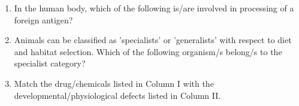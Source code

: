 \documentclass[journal,12pt,onecolumn]{IEEEtran}
\theoremstyle{remark}
\begin{document}
\begin{enumerate}
    \item In the human body, which of the following is/are involved in processing of a foreign antigen?

    \hfill{}
    \begin{enumerate}
    \end{enumerate}

    \item Animals can be classified as 'specialists' or 'generalists' with respect to diet and habitat selection. Which of the following organism/s belong/s to the specialist category?

    \hfill{}
    \begin{enumerate}
    \end{enumerate}

    \item Match the drug/chemicals listed in Column I with the developmental/physiological defects listed in Column II.


\end{enumerate}
\end{document}

